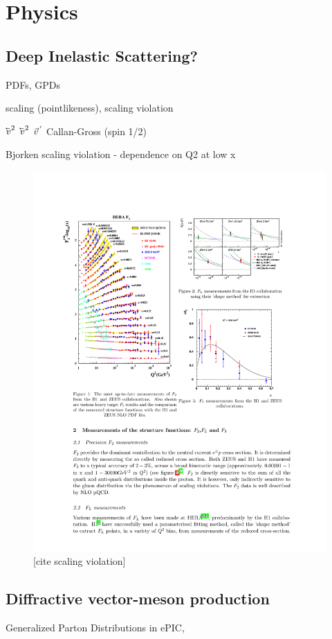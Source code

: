 \chapter{Physics}\label{cha:physics} %

\section{Deep Inelastic Scattering?}
PDFs, GPDs

scaling (pointlikeness), scaling violation

$\cev{v}^{2}$
$\cev{v}^2$
$\vec{v}^{\,'}$
Callan-Gross (spin 1/2)

Bjorken scaling violation - dependence on Q2 at low x

\begin{figure}[H]
    \centering
    \includegraphics[width=.7\linewidth]{img/scaling_violation.pdf}
    \caption{[cite scaling violation]}
    \label{fig:physics:scaling_violation}
\end{figure}

\section{Diffractive vector-meson production}
Generalized Parton Distributions in ePIC, 

